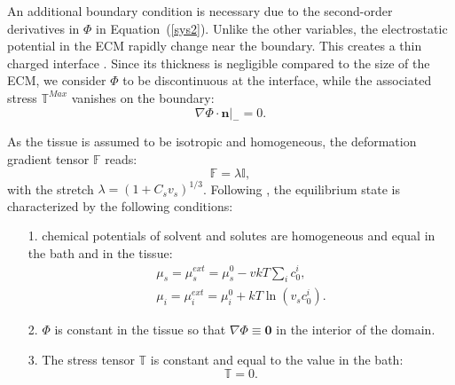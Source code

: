 \documentclass[runningheads]{llncs}
\newcommand{\F}{\ensuremath{\mathbb{F}}}
\begin{document}
An additional boundary condition is necessary due to the second-order derivatives in $\Phi$ in Equation~(\ref{sys2}). Unlike the other variables, the electrostatic potential in the ECM rapidly change near the boundary. This creates a thin charged interface \cite{swell2}. Since its thickness is negligible compared to the size of the ECM, we consider $\Phi$ to be discontinuous at the interface, while the associated stress $\mathbb{T}^{Max}$ vanishes on the boundary:
\begin{equation}
\left.\nabla \Phi \cdot \mathbf{n}\right|_-= 0.
\end{equation}

As the tissue is assumed to be isotropic and homogeneous, the deformation gradient tensor $\F$ reads:
\begin{equation}
\F= \lambda \mathbb{I},\label{deffree}                                                                
\end{equation}
with the stretch $\lambda=(1+C_s v_s)^{1/3}$. Following \cite{DROZDOVph}, the equilibrium state is characterized by the following conditions:
\begin{itemize}
	\item[1.] chemical potentials of solvent and solutes are homogeneous and equal in the bath and in the tissue:
	\begin{eqnarray}
	\mu_s=\mu^{ext}_s = \mu^0_s - vkT \sum_i c^i_0 ,\\\label{free1}
	\mu_i=\mu^{ext}_i = \mu^0_i +kT\ln(v_sc^i_0).\label{freeend}
	\end{eqnarray} 
	\item[2.] $\Phi$ is constant in the tissue so that $\nabla \Phi \equiv \mathbf{0}$ in the interior of the domain.
	\item[3.] The stress tensor $\mathbb{T}$ is constant and equal to the value in the bath:
	\begin{equation}
	\mathbb{T}=0.\label{free2}
	\end{equation} 
\end{itemize}
\end{document}
